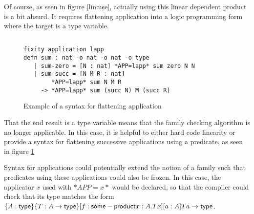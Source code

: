 Of course, as seen in figure \ref{lin:use}, actually using this linear dependent product is a bit
absurd.  It requires flattening application into a logic programming form where the target
is a type variable.



\begin{figure}[H]
\begin{lstlisting}

fixity application lapp
defn sum : nat -o nat -o nat -o type
   | sum-zero = [N : nat] *APP=lapp* sum zero N N
   | sum-succ = [N M R : nat] 
        *APP=lapp* sum N M R 
     -> *APP=lapp* sum (succ N) M (succ R)
\end{lstlisting}
\caption{Example of a syntax for flattening application}
\label{lin:flat}
\end{figure}


That the end result is a type variable means that the family checking algorithm
is no longer applicable. In this case, it is helpful to either hard code
linearity or provide a syntax for flattening successive applications using a predicate, as
seen in figure \ref{lin:flat}

Syntax for applications could potentially extend the notion of a family such that
predicates using these applications could also be frozen. In this case, the applicator $x$ used with 
$*APP = x*$ would be declared, so that the compiler could check that its type matches the form $\{ A : \mathsf{type} \}\{ T : A \rightarrow \mathsf{type} \}[f : \mathsf{some}-\mathsf{product} x : A . T x] [ a : A] T a \rightarrow \mathsf{type}$.
